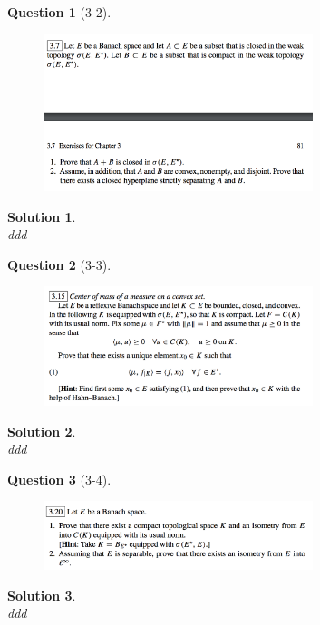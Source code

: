 \documentclass{article} %
\theoremstyle{quest}
\newtheorem*{question}{Question}
\newtheorem*{solution}{Solution}
\begin{document}
\newpage

\begin{question}[3-2]
\hfill
\begin{figure}[h!]
  \centering
    \includegraphics[width=0.7\textwidth]{func-c3-p2.png}
\end{figure}
\end{question}
\begin{solution} \hfill \\
ddd 
\end{solution}

\newpage

\begin{question}[3-3]
\hfill
\begin{figure}[h!]
  \centering
    \includegraphics[width=0.7\textwidth]{func-c3-p3.png}
\end{figure}
\end{question}
\begin{solution} \hfill \\
ddd 
\end{solution}

\newpage

\begin{question}[3-4]
\hfill
\begin{figure}[h!]
  \centering
    \includegraphics[width=0.7\textwidth]{func-c3-p4.png}
\end{figure}
\end{question}
\begin{solution} \hfill \\
ddd 
\end{solution}
\end{document}
